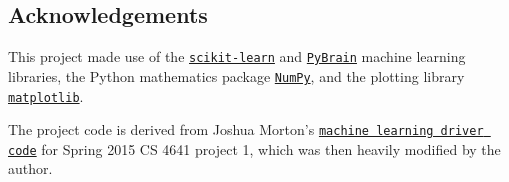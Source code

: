 \subsection{Acknowledgements}

This project made use of the \href{http://scikit-learn.org/stable/}{\texttt{scikit-learn}} and \href{http://pybrain.org}{\texttt{PyBrain}} machine learning libraries, the Python mathematics package \href{http://numpy.org}{\texttt{NumPy}}, and the plotting library \href{http://matplotlib.org}{\texttt{matplotlib}}.

The project code is derived from Joshua Morton's \href{https://github.com/joshuamorton/Machine-Learning/blob/master/P1/Adults/adult.py}{\texttt{machine learning driver code}} for Spring 2015 CS 4641 project 1, which was then heavily modified by the author.
